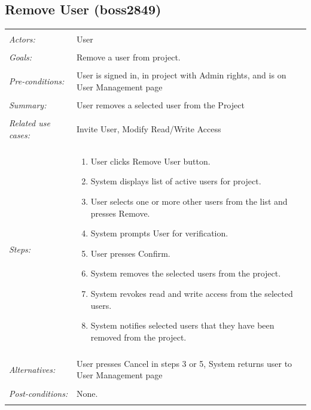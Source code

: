 \documentclass[11pt]{report}
\begin{document}
\subsection{Remove User  (boss2849)}
\begin{tabular}{ p{2cm} p{12cm} }
 \hline
 \\
 \textit{Actors:} & User \\ 
 \\
 \textit{Goals:} & Remove a user from project. \\
 \\
 \textit{Pre-conditions:} & User is signed in, in project with Admin rights, and is on User Management page\\
 \\
 \textit{Summary:} & User removes a selected user from the Project \\ 
 \\
 \textit{Related use cases:} & Invite User, Modify Read/Write Access \\ 
 \\
 \textit{Steps:} & \begin{enumerate}
  \item User clicks Remove User button.
  \item System displays list of active users for project.
  \item User selects one or more other users from the list and presses Remove.
  \item System prompts User for verification.
  \item User presses Confirm.
  \item System removes the selected users from the project.
  \item System revokes read and write access from the selected users.
  \item System notifies selected users that they have been removed from the project.
 \end{enumerate} \\
 \\
 \textit{Alternatives:} & User presses Cancel in steps 3 or 5, System returns user to User Management page \\
 \\
 \textit{Post-conditions:} & None. \\
 \\
\hline
\end{tabular}
\end{document}
